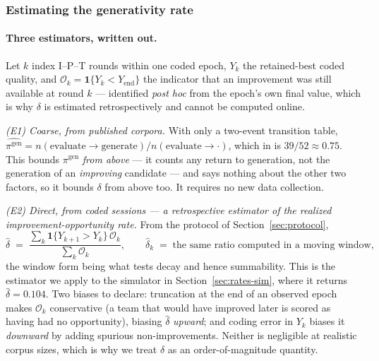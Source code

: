 \documentclass[11pt]{article}
\begin{document}
\subsubsection*{Estimating the generativity rate}

\paragraph{Three estimators, written out.} Let $k$ index I--P--T rounds within one coded epoch, $Y_k$ the retained-best coded quality, and $\mathcal{O}_k=\mathbf 1\{Y_k<Y_{\text{end}}\}$ the indicator that an improvement was still available at round $k$ --- identified \emph{post hoc} from the epoch's own final value, which is why $\delta$ is estimated retrospectively and cannot be computed online.

\emph{(E1) Coarse, from published corpora.} With only a two-event transition table, $\widehat{\pi^{\text{gen}}}=n(\text{evaluate}\to\text{generate})/n(\text{evaluate}\to\cdot)$, which in \citet{sung2019} is $39/52\approx0.75$. This bounds $\pi^{\text{gen}}$ \emph{from above} --- it counts any return to generation, not the generation of an \emph{improving} candidate --- and says nothing about the other two factors, so it bounds $\delta$ from above too. It requires no new data collection.

\emph{(E2) Direct, from coded sessions --- a retrospective estimator of the realized improvement-opportunity rate.} From the protocol of Section~\ref{sec:protocol},
\begin{equation}
\label{eq:delta-hat}
\hat\delta \;=\; \frac{\sum_k \mathbf 1\{Y_{k+1}>Y_k\}\,\mathcal{O}_k}{\sum_k \mathcal{O}_k},
\qquad
\hat\delta_k \;=\; \text{the same ratio computed in a moving window},
\end{equation}
the window form being what tests decay and hence summability. This is the estimator we apply to the simulator in Section~\ref{sec:rates-sim}, where it returns $\hat\delta=0.104$. Two biases to declare: truncation at the end of an observed epoch makes $\mathcal{O}_k$ conservative (a team that would have improved later is scored as having had no opportunity), biasing $\hat\delta$ \emph{upward}; and coding error in $Y_k$ biases it \emph{downward} by adding spurious non-improvements. Neither is negligible at realistic corpus sizes, which is why we treat $\hat\delta$ as an order-of-magnitude quantity.
\end{document}
